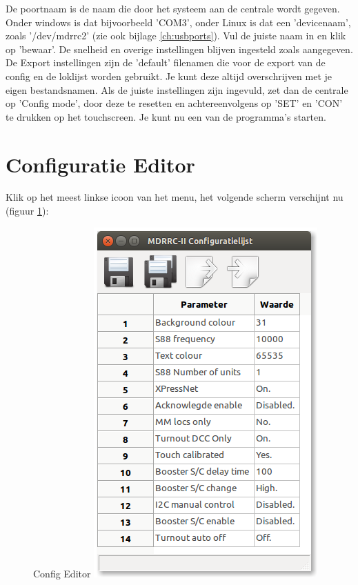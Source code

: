 \documentclass[12pt,a4paper]{report}
\begin{document}
De poortnaam is de naam die door het systeem aan de centrale wordt gegeven. Onder windows is dat bijvoorbeeld 'COM3', onder Linux is dat een 'devicenaam', zoals '/dev/mdrrc2' (zie ook bijlage \ref{ch:usbports}). Vul de juiste naam in en klik op 'bewaar'. De snelheid en overige instellingen blijven ingesteld zoals aangegeven.
De Export instellingen zijn de 'default' filenamen die voor de export van de config en de loklijst worden gebruikt. Je kunt deze altijd overschrijven met je eigen bestandsnamen.
Als de juiste instellingen zijn ingevuld, zet dan de centrale op 'Config mode', door deze te resetten en achtereenvolgens op 'SET' en 'CON' te drukken op het touchscreen.
Je kunt nu een van de programma's starten.

\section{Configuratie Editor}
Klik op het meest linkse icoon van het menu, het volgende scherm verschijnt nu (figuur \ref{scs:configeditor}):\\

\begin{figure}[!ht]
  \captionbox
  {Config Editor\label{scs:configeditor}}
  {\includegraphics[scale=0.5]{images/rcu_screenshot3}}
\end{figure}
\end{document}
